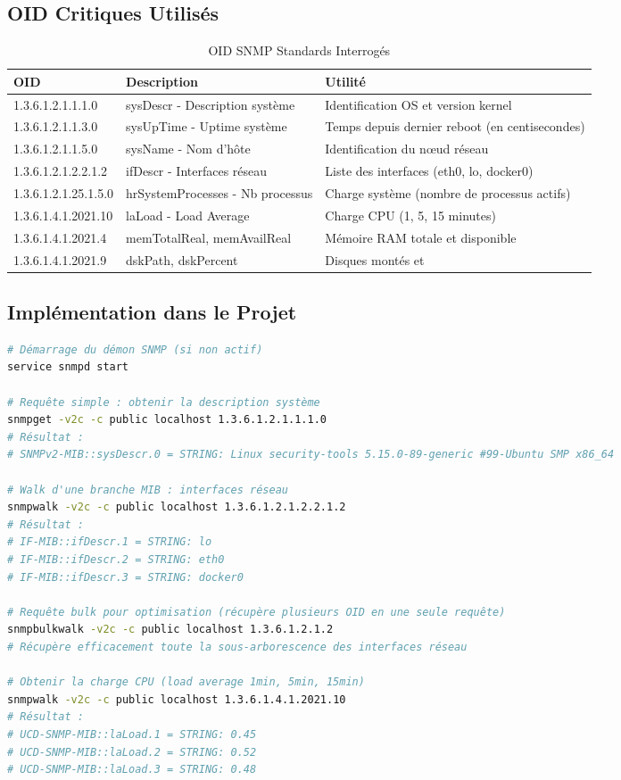 \documentclass[11pt,a4paper]{report}
\begin{document}
\subsection{OID Critiques Utilisés}

\begin{table}[H]
\centering
\caption{OID SNMP Standards Interrogés}
\label{tab:snmp_oids}
\begin{tabular}{|l|p{6cm}|p{4cm}|}
\hline
\textbf{OID} & \textbf{Description} & \textbf{Utilité} \\
\hline
1.3.6.1.2.1.1.1.0 & sysDescr - Description système & Identification OS et version kernel \\
\hline
1.3.6.1.2.1.1.3.0 & sysUpTime - Uptime système & Temps depuis dernier reboot (en centisecondes) \\
\hline
1.3.6.1.2.1.1.5.0 & sysName - Nom d'hôte & Identification du nœud réseau \\
\hline
1.3.6.1.2.1.2.2.1.2 & ifDescr - Interfaces réseau & Liste des interfaces (eth0, lo, docker0) \\
\hline
1.3.6.1.2.1.25.1.5.0 & hrSystemProcesses - Nb processus & Charge système (nombre de processus actifs) \\
\hline
1.3.6.1.4.1.2021.10 & laLoad - Load Average & Charge CPU (1, 5, 15 minutes) \\
\hline
1.3.6.1.4.1.2021.4 & memTotalReal, memAvailReal & Mémoire RAM totale et disponible \\
\hline
1.3.6.1.4.1.2021.9 & dskPath, dskPercent & Disques montés et %
\hline
\end{tabular}
\end{table}

\subsection{Implémentation dans le Projet}

\begin{lstlisting}[language=bash, caption=Exemples de Requêtes SNMP, basicstyle=\ttfamily\tiny]
# Démarrage du démon SNMP (si non actif)
service snmpd start

# Requête simple : obtenir la description système
snmpget -v2c -c public localhost 1.3.6.1.2.1.1.1.0
# Résultat : 
# SNMPv2-MIB::sysDescr.0 = STRING: Linux security-tools 5.15.0-89-generic #99-Ubuntu SMP x86_64

# Walk d'une branche MIB : interfaces réseau
snmpwalk -v2c -c public localhost 1.3.6.1.2.1.2.2.1.2
# Résultat :
# IF-MIB::ifDescr.1 = STRING: lo
# IF-MIB::ifDescr.2 = STRING: eth0
# IF-MIB::ifDescr.3 = STRING: docker0

# Requête bulk pour optimisation (récupère plusieurs OID en une seule requête)
snmpbulkwalk -v2c -c public localhost 1.3.6.1.2.1.2
# Récupère efficacement toute la sous-arborescence des interfaces réseau

# Obtenir la charge CPU (load average 1min, 5min, 15min)
snmpwalk -v2c -c public localhost 1.3.6.1.4.1.2021.10
# Résultat :
# UCD-SNMP-MIB::laLoad.1 = STRING: 0.45
# UCD-SNMP-MIB::laLoad.2 = STRING: 0.52
# UCD-SNMP-MIB::laLoad.3 = STRING: 0.48
\end{lstlisting}
\end{document}
